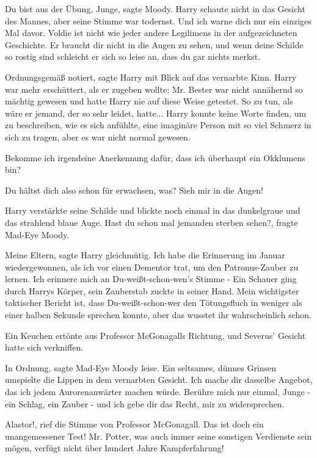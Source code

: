 \glqq{}Du bist aus der Übung, Junge\grqq{}, sagte Moody. Harry schaute nicht in
das Gesicht des Mannes, aber seine Stimme war todernst. \glqq{}Und ich warne dich
nur ein einziges Mal davor. Voldie ist nicht wie jeder andere Legilimens in der
aufgezeichneten Geschichte. Er braucht dir nicht in die Augen zu sehen, und wenn
deine Schilde so rostig sind schleicht er sich so leise an, dass du gar nichts
merkst.\grqq{}

\glqq{}Ordnungsgemäß notiert\grqq{}, sagte Harry mit Blick auf das vernarbte
Kinn. Harry war mehr erschüttert, als er zugeben wollte; Mr. Bester war nicht
annähernd so mächtig gewesen und hatte Harry nie auf diese Weise getestet. So zu
tun, als wäre er jemand, der so sehr leidet, hatte... Harry konnte keine Worte
finden, um zu beschreiben, wie es sich anfühlte, eine imaginäre Person mit so
viel Schmerz in sich zu tragen, aber es war nicht normal gewesen.

\glqq{}Bekomme ich irgendeine Anerkennung dafür, dass ich überhaupt ein Okklumens
bin?\grqq{}

\glqq{}Du hältst dich also schon für erwachsen, was? Sieh mir in die
Augen!\grqq{}

Harry verstärkte seine Schilde und blickte noch einmal in das dunkelgraue und
das strahlend blaue Auge. \glqq{}Hast du schon mal jemanden sterben
sehen?\grqq{}, fragte Mad-Eye Moody.

\glqq{}Meine Eltern\grqq{}, sagte Harry gleichmütig. \glqq{}Ich habe die
Erinnerung im Januar wiedergewonnen, als ich vor einen Dementor trat, um den
Patronus-Zauber zu lernen. Ich erinnere mich an Du-weißt-schon-wen's Stimme
-\grqq{} Ein Schauer ging durch Harrys Körper, sein Zauberstab zuckte in seiner
Hand. \glqq{}Mein wichtigster taktischer Bericht ist, dass Du-weißt-schon-wer den
Tötungsfluch in weniger als einer halben Sekunde sprechen konnte, aber das
wusstet ihr wahrscheinlich schon.\grqq{}

Ein Keuchen ertönte aus Professor McGonagalls Richtung, und Severus' Gesicht
hatte sich verkniffen.

\glqq{}In Ordnung\grqq{}, sagte Mad-Eye Moody leise. Ein seltsames, dünnes
Grinsen umspielte die Lippen in dem vernarbten Gesicht. \glqq{}Ich mache dir
dasselbe Angebot, das ich jedem Aurorenanwärter machen würde. Berühre mich nur
einmal, Junge - ein Schlag, ein Zauber - und ich gebe dir das Recht, mir zu
widersprechen.\grqq{}

\glqq{}Alastor!\grqq{}, rief die Stimme von Professor McGonagall. \glqq{}Das ist
doch ein unangemessener Test! Mr. Potter, was auch immer seine sonstigen
Verdienste sein mögen, verfügt nicht über hundert Jahre Kampferfahrung!\grqq{}

